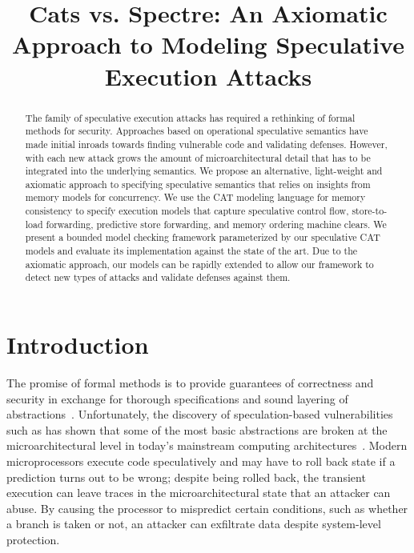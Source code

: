 \documentclass[conference]{IEEEtran}
\begin{document}
\title{Cats vs. Spectre: An Axiomatic Approach to Modeling Speculative Execution Attacks}

\author{
\and
{}
}

\maketitle
\thispagestyle{plain}
\pagestyle{plain}

\begin{abstract}
The \spectre{} family of speculative execution attacks has required a rethinking of formal methods for security. Approaches based on operational speculative semantics have made initial inroads towards finding vulnerable code and validating defenses. 
%
However, with each new attack grows the amount of microarchitectural detail that has to be integrated into the underlying semantics. 
%
We propose an alternative, light-weight and axiomatic approach to specifying speculative semantics that relies on insights from memory models for concurrency. We use the CAT modeling language for memory consistency to specify execution models that capture speculative control flow, store-to-load forwarding, predictive store forwarding, and memory ordering machine clears.
%
We present a bounded model checking framework parameterized by our speculative CAT models and evaluate its implementation against the state of the art. Due to the axiomatic approach, our models can be rapidly extended to allow our framework to detect new types of attacks and validate defenses against them.
%
\end{abstract}

\section{Introduction}
\label{sec:introduction}

The promise of formal methods is to provide guarantees of correctness and security in exchange for thorough specifications and sound layering of abstractions~\cite{ChongGDMPSSZ16}. 
Unfortunately, the discovery of speculation-based vulnerabilities such as \spectre has shown that some of the most basic abstractions are broken at the microarchitectural level in today's mainstream computing architectures~\cite{KocherHFGGHHLM019}. 
%
Modern microprocessors execute code speculatively and may have to roll back state if a prediction turns out to be wrong; despite being rolled back, the transient execution can leave traces in the microarchitectural state that an attacker can abuse. By causing the processor to mispredict certain conditions, such as whether a branch is taken or not, an attacker can exfiltrate data despite system-level protection. 
\end{document}
